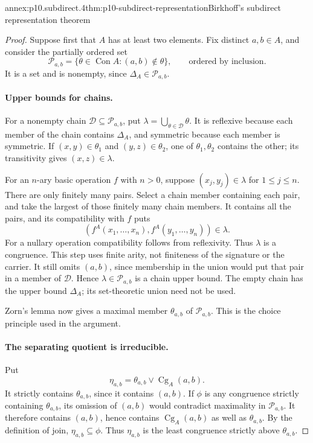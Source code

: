 \begin{annexitem}{annex:p10.subdirect.4}{thm:p10-subdirect-representation}{Birkhoff's subdirect representation theorem}
\begin{proof}
Suppose first that \(A\) has at least two elements.
Fix distinct \(a,b\in A\), and consider the partially ordered set
\[
 \mathcal P_{a,b}
   =\{\theta\in\operatorname{Con}A:(a,b)\notin\theta\},
 \qquad\text{ordered by inclusion}.
\]
It is a set and is nonempty, since \(\Delta_A\in\mathcal P_{a,b}\).

\paragraph{Upper bounds for chains.}
For a nonempty chain \(\mathcal D\subseteq\mathcal P_{a,b}\),
put \(\lambda=\bigcup_{\theta\in\mathcal D}\theta\).
It is reflexive because each member of the chain contains
\(\Delta_A\), and symmetric because each member is symmetric.
If \((x,y)\in\theta_1\) and \((y,z)\in\theta_2\), one of
\(\theta_1,\theta_2\) contains the other; its transitivity gives
\((x,z)\in\lambda\).

For an \(n\)-ary basic operation \(f\) with \(n>0\), suppose
\((x_j,y_j)\in\lambda\) for \(1\leq j\leq n\).
There are only finitely many pairs.  Select a chain member
containing each pair, and take the largest of those finitely
many chain members.  It contains all the pairs, and its
compatibility with \(f\) puts
\[
 (f^A(x_1,\ldots,x_n),f^A(y_1,\ldots,y_n))\in\lambda.
\]
For a nullary operation compatibility follows from reflexivity.
Thus \(\lambda\) is a congruence.  This step uses finite arity,
not finiteness of the signature or the carrier.
It still omits \((a,b)\), since membership in the union would
put that pair in a member of \(\mathcal D\).
Hence \(\lambda\in\mathcal P_{a,b}\) is a chain upper bound.
The empty chain has the upper bound \(\Delta_A\); its set-theoretic
union need not be used.

Zorn's lemma now gives a maximal member \(\theta_{a,b}\) of
\(\mathcal P_{a,b}\).
This is the choice principle used in the argument.

\paragraph{The separating quotient is irreducible.}
Put
\[
 \eta_{a,b}
       =\theta_{a,b}\vee\operatorname{Cg}_A(a,b).
\]
It strictly contains \(\theta_{a,b}\), since it contains
\((a,b)\).
If \(\phi\) is any congruence strictly containing
\(\theta_{a,b}\), its omission of \((a,b)\) would contradict
maximality in \(\mathcal P_{a,b}\).
It therefore contains \((a,b)\), hence contains
\(\operatorname{Cg}_A(a,b)\) as well as \(\theta_{a,b}\).
By the definition of join,
\(\eta_{a,b}\subseteq\phi\).
Thus \(\eta_{a,b}\) is the least congruence strictly above
\(\theta_{a,b}\).


\end{proof}
\end{annexitem}
